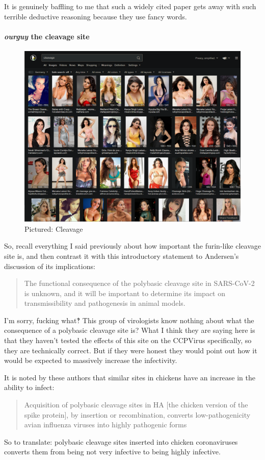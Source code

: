 \documentclass[11pt]{article}
\begin{document}
It is genuinely baffling to me that such a widely cited paper gets away with such terrible deductive reasoning because they use fancy words.

\paragraph{\emph{ourguy} the cleavage site}
\label{sec:orge4a6ffe}
\begin{figure}[htbp]
\centering
\includegraphics[width=.9\linewidth]{./images/cleavage.png}
\caption{Pictured: Cleavage}
\end{figure}

So, recall everything I said previously about how important the furin-like cleavage site is, and then contrast it with this introductory statement to Andersen's discussion of its implications:
\begin{quote}
The functional consequence of the polybasic cleavage site in SARS-CoV-2 is unknown, and it will be important to determine its impact on transmissibility and pathogenesis in animal models.
\end{quote}
I'm sorry, fucking what‽ This group of virologists know nothing about what the consequence of a polybasic cleavage site is? What I think they are saying here is that they haven't tested the effects of this site on the CCPVirus specifically, so they are technically correct. But if they were honest they would point out how it would be expected to massively increase the infectivity.

It is noted by these authors that similar sites in chickens have an increase in the ability to infect:
\begin{quote}
Acquisition of polybasic cleavage sites in HA [the chicken version of the spike protein], by insertion or recombination, converts low-pathogenicity avian influenza viruses into highly pathogenic forms
\end{quote}
So to translate: polybasic cleavage sites inserted into chicken coronaviruses converts them from being not very infective to being highly infective.
\end{document}
